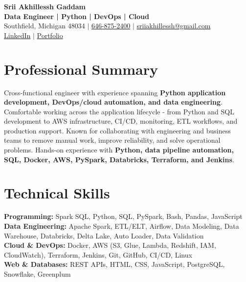 \documentclass[letterpaper,10pt]{article}
\begin{document}
\fontsize{9.35pt}{10.45pt}\selectfont

\begin{center}
    {\LARGE \textbf{Srii Akhillessh Gaddam}} \\[-1pt]
    \textbf{Data Engineer | Python | DevOps | Cloud} \\[2pt]
    Southfield, Michigan 48034 $|$
    \href{tel:6468752400}{646-875-2400} $|$
    \href{mailto:sriiakhillessh@gmail.com}{sriiakhillessh@gmail.com} \\[1pt]
    \href{https://www.linkedin.com/in/srii-akhiilessh-gaddam-b48668191/}{LinkedIn} $|$
    \href{https://sriiakhillesshg.github.io/portfolio/}{Portfolio}
\end{center}
\vspace{-8pt}

\section{Professional Summary}
\small{Cross-functional engineer with experience spanning \textbf{Python application development, DevOps/cloud automation, and data engineering}. Comfortable working across the application lifecycle - from Python and SQL development to AWS infrastructure, CI/CD, monitoring, ETL workflows, and production support. Known for collaborating with engineering and business teams to remove manual work, improve reliability, and solve operational problems. Hands-on experience with \textbf{Python, data pipeline automation, SQL, Docker, AWS, PySpark, Databricks, Terraform, and Jenkins}.}

\section{Technical Skills}
\small{
\textbf{Programming:} Spark SQL, Python, SQL, PySpark, Bash, Pandas, JavaScript \\
\textbf{Data Engineering:} Apache Spark, ETL/ELT, Airflow, Data Modeling, Data Warehouse, Databricks, Delta Lake, Auto Loader, Data Validation \\
\textbf{Cloud \& DevOps:} Docker, AWS (S3, Glue, Lambda, Redshift, IAM, CloudWatch), Terraform, Jenkins, Git, GitHub, CI/CD, Linux \\
\textbf{Web \& Databases:} REST APIs, HTML, CSS, JavaScript, PostgreSQL, Snowflake, Greenplum
}
\end{document}
